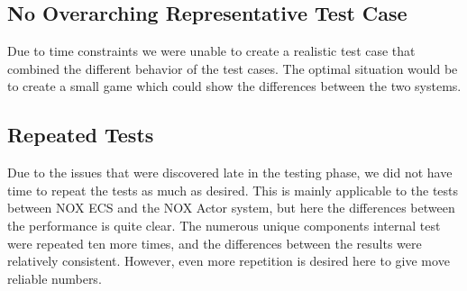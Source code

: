 \subsection{No Overarching Representative Test Case}
Due to time constraints we were unable to create a realistic test case that combined the different behavior
of the test cases.
The optimal situation would be to create a small game which could show the differences between the two systems.

\subsection{Repeated Tests}
Due to the issues that were discovered late in the testing phase, we did not have time to repeat the tests
as much as desired.
This is mainly applicable to the tests between NOX ECS and the NOX Actor system, but here the differences
between the performance is quite clear.
The numerous unique components internal test were repeated ten more times, and the differences between
the results were relatively consistent. However, even more repetition is desired here to give move reliable numbers.
